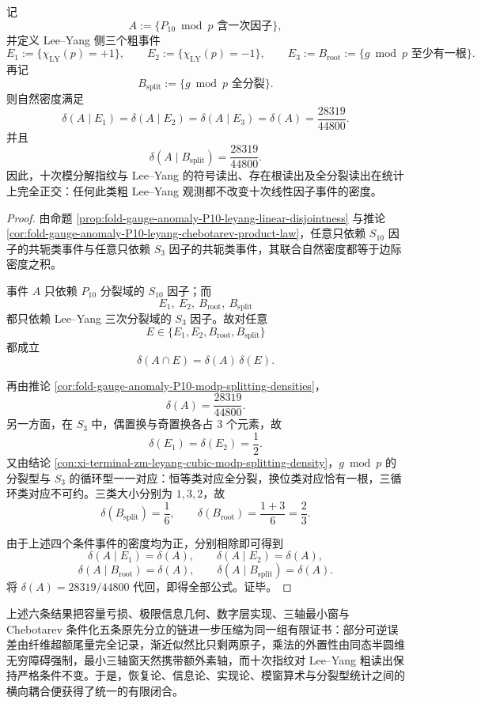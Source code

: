 \begin{theorem}\label{thm:xi-time-part64b-p10-fingerprint-leyang-coarse-readout-invariance}
记
\[
A:=\{\text{\(P_{10}\bmod p\) 含一次因子}\},
\]
并定义 Lee--Yang 侧三个粗事件
\[
E_1:=\{\chi_{\mathrm{LY}}(p)=+1\},
\qquad
E_2:=\{\chi_{\mathrm{LY}}(p)=-1\},
\qquad
E_3:=B_{\mathrm{root}}:=\{\text{\(g\bmod p\) 至少有一根}\}.
\]
再记
\[
B_{\mathrm{split}}:=\{\text{\(g\bmod p\) 全分裂}\}.
\]
则自然密度满足
\[
\boxed{\;
\delta(A\mid E_1)
=
\delta(A\mid E_2)
=
\delta(A\mid E_3)
=
\delta(A)
=
\frac{28319}{44800}.\;}
\]
并且
\[
\boxed{\;
\delta(A\mid B_{\mathrm{split}})
=
\frac{28319}{44800}.\;}
\]
因此，十次模分解指纹与 Lee--Yang 的符号读出、存在根读出及全分裂读出在统计上完全正交：任何此类粗 Lee--Yang 观测都不改变十次线性因子事件的密度。
\end{theorem}
\begin{proof}
由命题 \ref{prop:fold-gauge-anomaly-P10-leyang-linear-disjointness} 与推论
\ref{cor:fold-gauge-anomaly-P10-leyang-chebotarev-product-law}，任意只依赖 \(S_{10}\) 因子的共轭类事件与任意只依赖 \(S_3\) 因子的共轭类事件，其联合自然密度都等于边际密度之积。

事件 \(A\) 只依赖 \(P_{10}\) 分裂域的 \(S_{10}\) 因子；而
\[
E_1,\ E_2,\ B_{\mathrm{root}},\ B_{\mathrm{split}}
\]
都只依赖 Lee--Yang 三次分裂域的 \(S_3\) 因子。故对任意
\[
E\in\{E_1,E_2,B_{\mathrm{root}},B_{\mathrm{split}}\}
\]
都成立
\[
\delta(A\cap E)=\delta(A)\,\delta(E).
\]

再由推论 \ref{cor:fold-gauge-anomaly-P10-modp-splitting-densities}，
\[
\delta(A)=\frac{28319}{44800}.
\]
另一方面，在 \(S_3\) 中，偶置换与奇置换各占 \(3\) 个元素，故
\[
\delta(E_1)=\delta(E_2)=\frac12.
\]
又由结论 \ref{con:xi-terminal-zm-leyang-cubic-modp-splitting-density}，\(g\bmod p\) 的分裂型与 \(S_3\) 的循环型一一对应：恒等类对应全分裂，换位类对应恰有一根，三循环类对应不可约。三类大小分别为 \(1,3,2\)，故
\[
\delta(B_{\mathrm{split}})=\frac16,
\qquad
\delta(B_{\mathrm{root}})=\frac{1+3}{6}=\frac23.
\]

由于上述四个条件事件的密度均为正，分别相除即可得到
\[
\delta(A\mid E_1)=\delta(A),
\qquad
\delta(A\mid E_2)=\delta(A),
\]
\[
\delta(A\mid B_{\mathrm{root}})=\delta(A),
\qquad
\delta(A\mid B_{\mathrm{split}})=\delta(A).
\]
将 \(\delta(A)=28319/44800\) 代回，即得全部公式。证毕。
\end{proof}

\noindent
上述六条结果把容量亏损、极限信息几何、数字层实现、三轴最小窗与 Chebotarev 条件化五条原先分立的链进一步压缩为同一组有限证书：部分可逆误差由纤维超额尾量完全记录，渐近似然比只剩两原子，乘法的外置性由同态半圆维无穷障碍强制，最小三轴窗天然携带额外素轴，而十次指纹对 Lee--Yang 粗读出保持严格条件不变。于是，恢复论、信息论、实现论、模窗算术与分裂型统计之间的横向耦合便获得了统一的有限闭合。

\endinput
